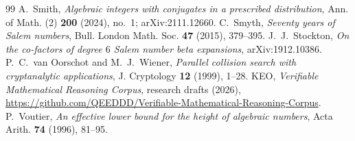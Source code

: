 \documentclass[11pt]{amsart}
\theoremstyle{definition}
\theoremstyle{remark}
\begin{document}
\begin{thebibliography}{99}
 A.~Smith, \emph{Algebraic integers with conjugates in a prescribed distribution}, Ann. of Math. (2) \textbf{200} (2024), no.~1; arXiv:2111.12660.
 C.~Smyth, \emph{Seventy years of Salem numbers}, Bull. London Math. Soc. \textbf{47} (2015), 379--395.
 J.~J.~Stockton, \emph{On the co-factors of degree $6$ Salem number beta expansions}, arXiv:1912.10386.
 P.~C.~van Oorschot and M.~J.~Wiener, \emph{Parallel collision search with cryptanalytic applications}, J. Cryptology \textbf{12} (1999), 1--28.
 KEO, \emph{Verifiable Mathematical Reasoning Corpus}, research drafts (2026), \url{https://github.com/QEEDDD/Verifiable-Mathematical-Reasoning-Corpus}.
 P.~Voutier, \emph{An effective lower bound for the height of algebraic numbers}, Acta Arith. \textbf{74} (1996), 81--95.
\end{thebibliography}
\end{document}
